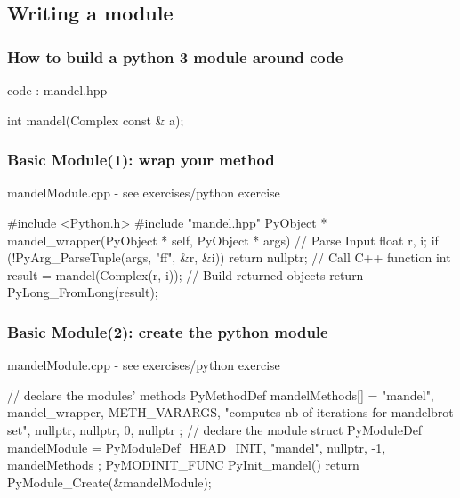 \subsection[module]{Writing a module}

\begin{frame}[fragile]
  \frametitle{How to build a python 3 module around \cpp code}
  \begin{block}{\cpp code : mandel.hpp}
    \begin{cppcode*}{}
      int mandel(Complex const & a);
    \end{cppcode*}
  \end{block}
\end{frame}

\begin{frame}[fragile]
  \frametitle{Basic Module(1): wrap your method}
  \begin{block}{mandelModule.cpp - see exercises/python exercise}
    \begin{cppcode*}{}
      #include <Python.h>
      #include "mandel.hpp"
      PyObject * mandel_wrapper(PyObject * self,
                                PyObject * args) {
        // Parse Input
        float r, i;
        if (!PyArg_ParseTuple(args, "ff", &r, &i))
          return nullptr;
        // Call C++ function
        int result = mandel(Complex(r, i));
        // Build returned objects
        return PyLong_FromLong(result);
      }
    \end{cppcode*}
  \end{block}
\end{frame}

\begin{frame}[fragile]
  \frametitle{Basic Module(2): create the python module}
  \begin{block}{mandelModule.cpp - see exercises/python exercise}
    \begin{cppcode*}{}
      // declare the modules' methods
      PyMethodDef mandelMethods[] = {
          {"mandel", mandel_wrapper, METH_VARARGS,
          "computes nb of iterations for mandelbrot set"},
          {nullptr, nullptr, 0, nullptr}
      };
      // declare the module
      struct PyModuleDef mandelModule = {
        PyModuleDef_HEAD_INIT,
        "mandel", nullptr, -1, mandelMethods
      };
      PyMODINIT_FUNC PyInit_mandel() {
        return PyModule_Create(&mandelModule);
      }
    \end{cppcode*}
  \end{block}
\end{frame}

